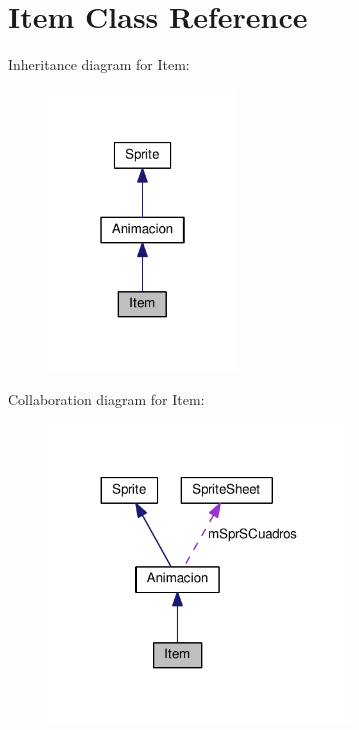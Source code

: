 \hypertarget{class_item}{}\section{Item Class Reference}
\label{class_item}


Inheritance diagram for Item\+:\nopagebreak
\begin{figure}[H]
\begin{center}
\leavevmode
\includegraphics[width=142pt]{class_item__inherit__graph}
\end{center}
\end{figure}


Collaboration diagram for Item\+:\nopagebreak
\begin{figure}[H]
\begin{center}
\leavevmode
\includegraphics[width=227pt]{class_item__coll__graph}
\end{center}
\end{figure}
